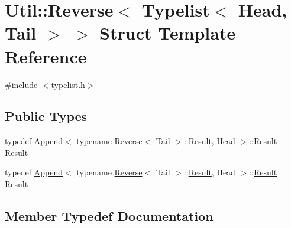 \hypertarget{structUtil_1_1TL_1_1Reverse_3_01Typelist_3_01Head_00_01Tail_01_4_01_4}{}\section{Util\+:\+:Reverse$<$ Typelist$<$ Head, Tail $>$ $>$ Struct Template Reference}
\label{structUtil_1_1TL_1_1Reverse_3_01Typelist_3_01Head_00_01Tail_01_4_01_4}


{\ttfamily \#include $<$typelist.\+h$>$}

\subsection*{Public Types}
\begin{DoxyCompactItemize}
\item 
typedef \mbox{\hyperlink{structUtil_1_1TL_1_1Append}{Append}}$<$ typename \mbox{\hyperlink{structUtil_1_1TL_1_1Reverse}{Reverse}}$<$ Tail $>$\+::\mbox{\hyperlink{structUtil_1_1TL_1_1Reverse_3_01Typelist_3_01Head_00_01Tail_01_4_01_4_a9886893d82dd4c1124f42d7d45fdbdbd}{Result}}, Head $>$\+::\mbox{\hyperlink{structUtil_1_1TL_1_1Reverse_3_01Typelist_3_01Head_00_01Tail_01_4_01_4_a9886893d82dd4c1124f42d7d45fdbdbd}{Result}} \mbox{\hyperlink{structUtil_1_1TL_1_1Reverse_3_01Typelist_3_01Head_00_01Tail_01_4_01_4_a9886893d82dd4c1124f42d7d45fdbdbd}{Result}}
\item 
typedef \mbox{\hyperlink{structUtil_1_1TL_1_1Append}{Append}}$<$ typename \mbox{\hyperlink{structUtil_1_1TL_1_1Reverse}{Reverse}}$<$ Tail $>$\+::\mbox{\hyperlink{structUtil_1_1TL_1_1Reverse_3_01Typelist_3_01Head_00_01Tail_01_4_01_4_a9886893d82dd4c1124f42d7d45fdbdbd}{Result}}, Head $>$\+::\mbox{\hyperlink{structUtil_1_1TL_1_1Reverse_3_01Typelist_3_01Head_00_01Tail_01_4_01_4_a9886893d82dd4c1124f42d7d45fdbdbd}{Result}} \mbox{\hyperlink{structUtil_1_1TL_1_1Reverse_3_01Typelist_3_01Head_00_01Tail_01_4_01_4_a9886893d82dd4c1124f42d7d45fdbdbd}{Result}}
\end{DoxyCompactItemize}


\subsection{Member Typedef Documentation}
\mbox{\label{structUtil_1_1TL_1_1Reverse_3_01Typelist_3_01Head_00_01Tail_01_4_01_4_a9886893d82dd4c1124f42d7d45fdbdbd}} 
